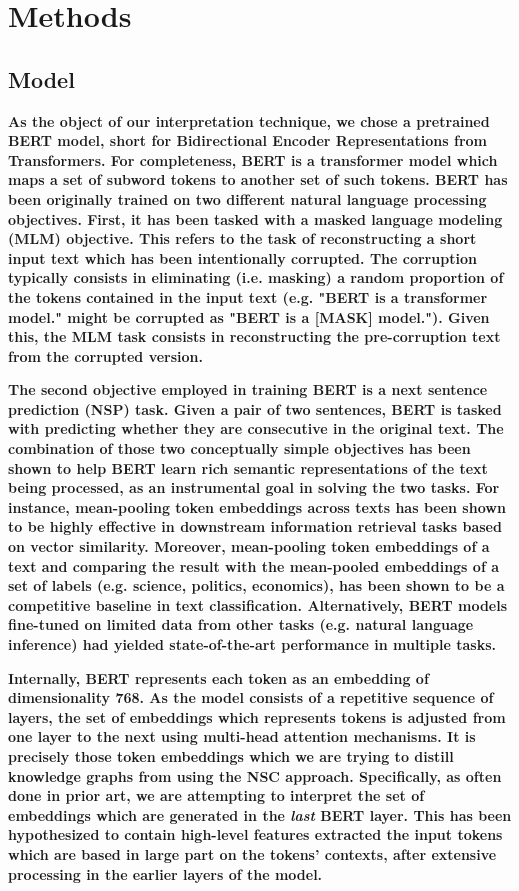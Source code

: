 \section{Methods}\label{sec:methods}

\subsection{Model}

\textbf{As the object of our interpretation technique, we chose a pretrained BERT model, short for Bidirectional Encoder Representations from Transformers. For completeness, BERT is a transformer model which maps a set of subword tokens to another set of such tokens. BERT has been originally trained on two different natural language processing objectives. First, it has been tasked with a masked language modeling (MLM) objective. This refers to the task of reconstructing a short input text which has been intentionally corrupted. The corruption typically consists in eliminating (i.e. masking) a random proportion of the tokens contained in the input text (e.g. "BERT is a transformer model." might be corrupted as "BERT is a [MASK] model."). Given this, the MLM task consists in reconstructing the pre-corruption text from the corrupted version.}

\textbf{The second objective employed in training BERT is a next sentence prediction (NSP) task. Given a pair of two sentences, BERT is tasked with predicting whether they are consecutive in the original text. The combination of those two conceptually simple objectives has been shown to help BERT learn rich semantic representations of the text being processed, as an instrumental goal in solving the two tasks. For instance, mean-pooling token embeddings across texts has been shown to be highly effective in downstream information retrieval tasks based on vector similarity. Moreover, mean-pooling token embeddings of a text and comparing the result with the mean-pooled embeddings of a set of labels (e.g. science, politics, economics), has been shown to be a competitive baseline in text classification. Alternatively, BERT models fine-tuned on limited data from other tasks (e.g. natural language inference) had yielded state-of-the-art performance in multiple tasks.}

\textbf{Internally, BERT represents each token as an embedding of dimensionality 768. As the model consists of a repetitive sequence of layers, the set of embeddings which represents tokens is adjusted from one layer to the next using multi-head attention mechanisms. It is precisely those token embeddings which we are trying to distill knowledge graphs from using the NSC approach. Specifically, as often done in prior art, we are attempting to interpret the set of embeddings which are generated in the \textit{last} BERT layer. This has been hypothesized to contain high-level features extracted the input tokens which are based in large part on the tokens' contexts, after extensive processing in the earlier layers of the model.}

